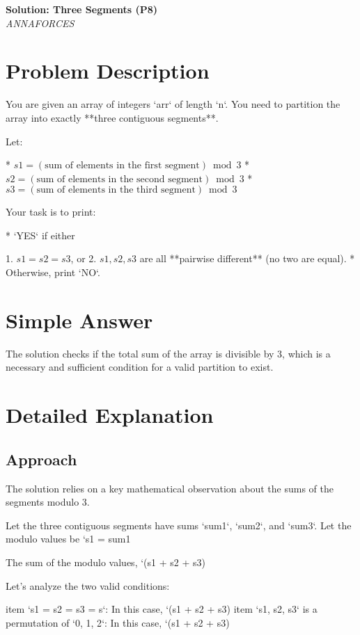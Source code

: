 \documentclass[11pt,a4paper]{article}
\begin{document}
\begin{center}
  {\LARGE \bf Solution: Three Segments (P8)}\\[6pt]
  {\large \it ANNAFORCES}\
  \vspace{6pt}
\end{center}

\section*{Problem Description}
You are given an array of integers `arr` of length `n`.
You need to partition the array into exactly **three contiguous segments**.

Let:

* $s1 = \left(\text{sum of elements in the first segment}\right) \bmod 3$
* $s2 = \left(\text{sum of elements in the second segment}\right) \bmod 3$
* $s3 = \left(\text{sum of elements in the third segment}\right) \bmod 3$

Your task is to print:

* `YES` if either

  1. $s1 = s2 = s3$, or
  2. $s1, s2, s3$ are all **pairwise different** (no two are equal).
* Otherwise, print `NO`.

\section*{Simple Answer}
The solution checks if the total sum of the array is divisible by 3, which is a necessary and sufficient condition for a valid partition to exist.

\section*{Detailed Explanation}
\subsection*{Approach}
The solution relies on a key mathematical observation about the sums of the segments modulo 3.

Let the three contiguous segments have sums `sum1`, `sum2`, and `sum3`. Let the modulo values be `s1 = sum1 %

The sum of the modulo values, `(s1 + s2 + s3) %

Let's analyze the two valid conditions:
\begin{enumerate}
  	item `s1 = s2 = s3 = s`: In this case, `(s1 + s2 + s3) %
  	item `{s1, s2, s3}` is a permutation of `{0, 1, 2}`: In this case, `(s1 + s2 + s3) %
\end{enumerate}
\end{document}
